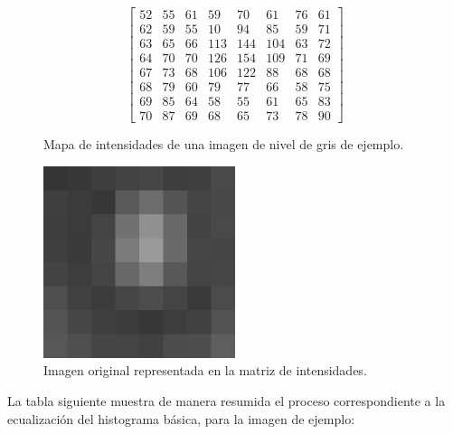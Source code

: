 \begin{figure}[H]
\centering
\[
\begin{bmatrix}
52 & 55 & 61 & 59  & 70  & 61  & 76 & 61 \\
62 & 59 & 55 & 10  & 94  & 85  & 59 & 71 \\
63 & 65 & 66 & 113 & 144 & 104 & 63 & 72 \\
64 & 70 & 70 & 126 & 154 & 109 & 71 & 69 \\
67 & 73 & 68 & 106 & 122 & 88  & 68 & 68 \\
68 & 79 & 60 & 79  & 77  & 66  & 58 & 75 \\
69 & 85 & 64 & 58  & 55  & 61  & 65 & 83 \\
70 & 87 & 69 & 68  & 65  & 73  & 78 & 90
\end{bmatrix}
\]
\caption{Mapa de intensidades de una imagen de nivel de gris de ejemplo.}
\label{fig:mapaintej}
\end{figure}

\begin{figure}[H]
\centering
\includegraphics[width=0.5\textwidth]{./Figures/JPEG_example_subimage.png}
\caption{Imagen original representada en la matriz de intensidades.}
\label{fig:mapaintejvis}
\end{figure}

La tabla siguiente muestra de manera resumida el proceso correspondiente a la ecualización del histograma básica, para la imagen de ejemplo:

